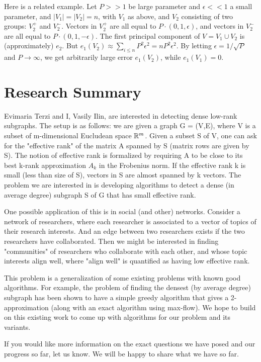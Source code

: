 \documentclass{article}
\begin{document}
Here is a related example. Let $P >> 1$ be large parameter and $\epsilon << 1$ a small parameter, and $|V_1| = |V_2| = n$, with $V_1$ as above, and $V_2$ consisting of two groups: $V_2^+$ and $V_2^-$. Vectors in $V_2^+$ are all equal to $P\cdot(0,1,\epsilon)$, and vectors in $V_2^-$ are all equal to $P\cdot(0,1,-\epsilon)$. The first principal component of $V = V_1\cup V_2$ is (approximately) $e_2$. But $e_1(V_2) \approx \sum_{i\leq n}P^2\epsilon^2 = n P^2\epsilon^2$. By letting $\epsilon = 1/\sqrt{P}$ and $P\to \infty$, we get arbitrarily large error $e_1(V_2)$, while $e_1(V_1) = 0$.


\section{Research Summary}
Evimaria Terzi and I, Vasily Ilin, are interested in detecting dense low-rank subgraphs.
The setup is as follows: we are given a graph G = (V,E), where V is a subset of m-dimensional Eucludean space $\mathbb{R}^m$. Given a subset S of V, one can ask for the "effective rank" of the matrix A spanned by S (matrix rows are given by S). The notion of effective rank is formalized by requiring A to be close to its best k-rank approximation $A_k$ in the Frobenius norm. If the effective rank k is small (less than size of S), vectors in S are almost spanned by k vectors. The problem we are interested in is developing algorithms to detect a dense (in average degree) subgraph S of G that has small effective rank.

One possible application of this is in social (and other) networks. Consider a network of researchers, where each researcher is associated to a vector of topics of their research interests. And an edge between two researchers exists if the two researchers have collaborated. Then we might be interested in finding "communities" of researchers who collaborate with each other, and whose topic interests align well, where "align well" is quantified as having low effective rank.

This problem is a generalization of some existing problems with known good algorithms. For example, the problem of finding the densest (by average degree) subgraph has been shown to have a simple greedy algorithm that gives a 2-approximation (along with an exact algorithm using max-flow). We hope to build on this existing work to come up with algorithms for our problem and its variants.

If you would like more information on the exact questions we have posed and our progress so far, let us know. We will be happy to share what we have so far.
\end{document}
